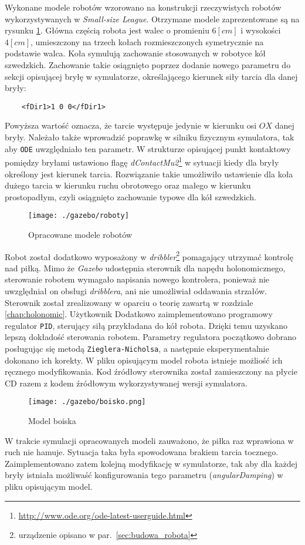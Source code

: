 	Wykonane modele robotów wzorowano na konstrukcji rzeczywistych robotów wykorzystywanych w \emph{Small-size League}. Otrzymane modele zaprezentowane są na rysunku \ref{fig:robots}.
	Główna częścią robota jest walec o promieniu $6[cm]$ i wysokości $4[cm]$, umieszczony na trzech kołach rozmieszczonych symetrycznie na podstawie walca.
	Koła symulują zachowanie stosowanych w robotyce kół szwedzkich. Zachowanie takie osiągnięto poprzez dodanie nowego parametru do sekcji opisującej bryłę w symulatorze,
	określającego kierunek siły tarcia dla danej bryły:
	\begin{lstlisting}	
	<fDir1>1 0 0</fDir1>
	\end{lstlisting}
	Powyższa wartość oznacza, że tarcie występuje jedynie w kierunku osi $OX$ danej bryły.
	Należało także wprowadzić poprawkę w silniku fizycznym symulatora, tak aby \texttt{ODE} uwzględniało ten parametr. W strukturze opisującej punkt kontaktowy pomiędzy bryłami
	ustawiono flagę \textit{dContactMu2}\protect\footnote{\url{http://www.ode.org/ode-latest-userguide.html}} w sytuacji kiedy dla bryły określony jest kierunek tarcia. Rozwiązanie takie umożliwiło ustawienie dla koła dużego tarcia w kierunku ruchu obrotowego oraz małego
	w kierunku prostopadłym, czyli osiągnięto zachowanie typowe dla kół szwedzkich.
	\begin{figure}[H]
	\centering
	\texttt{[image: ./gazebo/roboty]}
	\caption{Opracowane modele robotów  \label{fig:robots}}
	\end{figure}
	Robot został dodatkowo wyposażony w \textit{dribbler}\protect\footnote{urządzenie opisano w par.~\ref{sec:budowa_robota}} pomagający utrzymać kontrolę nad piłką.
	Mimo że \textit{Gazebo} udostępnia sterownik dla napędu holonomicznego, sterowanie robotem wymagało napisania nowego kontrolera, ponieważ nie uwzględniał on obsługi
	\textit{dribblera}, ani nie umożliwiał oddawania strzałów. Sterownik został zrealizowany w oparciu o teorię zawartą w rozdziale \ref{chap:holonomic}. Użytkownik  Dodatkowo zaimplementowano
	programowy regulator \texttt{PID}, sterujący siłą przykładana do kół robota. Dzięki temu uzyskano lepszą dokładość sterowania robotem. Parametry regulatora początkowo dobrano posługując się metodą \texttt{Zieglera-Nicholsa}, a następnie eksperymentalnie dokonano ich korekty.
	W pliku opisującym model robota istnieje możliość ich ręcznego modyfikowania.
	Kod źródłowy sterownika został zamieszczony na płycie CD razem z kodem źródłowym wykorzystywanej wersji symulatora.	
	\begin{figure}[H]
	\centering
	\texttt{[image: ./gazebo/boisko.png]}
	\caption{Model boiska}
	\end{figure}
	W trakcie symulacji opracowanych modeli zauważono, że piłka raz wprawiona w ruch nie hamuje. Sytuacja taka była spowodowana brakiem tarcia tocznego. Zaimplementowano zatem kolejną modyfikację w 
	symulatorze, tak aby dla każdej bryły istniała możliwaść konfigurowania tego parametru (\textit{angularDamping}) w pliku opisującym model.

